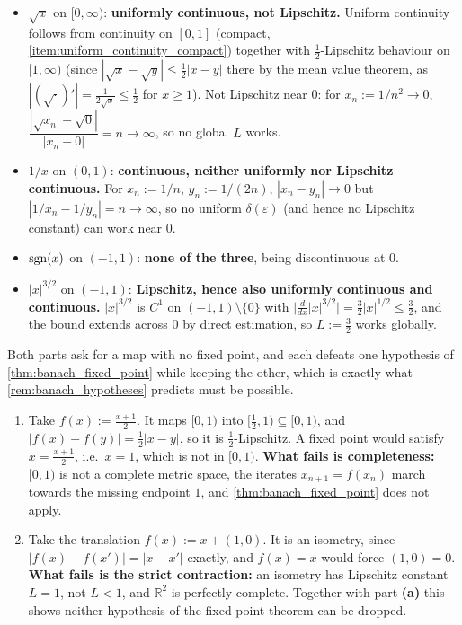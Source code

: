 \begin{exercisesolution}
\label{sol:continuity_classification}
\begin{itemize}
  \item $\sqrt{x}$ on $[0,\infty)$: \textbf{uniformly continuous, not Lipschitz.} Uniform
    continuity follows from continuity on $[0,1]$ (compact, \cref{item:uniform_continuity_compact})
    together with $\tfrac12$-Lipschitz behaviour on $[1,\infty)$ (since $|\sqrt x - \sqrt y| \leq
    \tfrac12|x-y|$ there by the mean value theorem, as $|(\sqrt{\cdot})'| = \tfrac{1}{2\sqrt x}
    \leq \tfrac12$ for $x \geq 1$). Not Lipschitz near $0$: for $x_n :=
    1/n^2 \to 0$, $\dfrac{|\sqrt{x_n}-\sqrt0|}{|x_n-0|} = n \to \infty$, so no global $L$ works.
  \item $1/x$ on $(0,1)$: \textbf{continuous, neither uniformly nor Lipschitz continuous.} For
    $x_n := 1/n$, $y_n := 1/(2n)$, $|x_n-y_n| \to 0$ but $|1/x_n - 1/y_n| = n \to \infty$, so no
    uniform $\delta(\varepsilon)$ (and hence no Lipschitz constant) can work near $0$.
  \item $\operatorname{sgn}(x)$ on $(-1,1)$: \textbf{none of the three}, being discontinuous at $0$.
  \item $|x|^{3/2}$ on $(-1,1)$: \textbf{Lipschitz, hence also uniformly continuous and
    continuous.} $|x|^{3/2}$ is $C^1$ on $(-1,1)\setminus\{0\}$ with $\big|\tfrac{d}{dx}|x|^{3/2}\big|
    = \tfrac32|x|^{1/2} \leq \tfrac32$, and the bound extends across $0$ by direct estimation, so
    $L := \tfrac32$ works globally.
\end{itemize}
\end{exercisesolution}

\begin{exercisesolution}
\label{sol:lipschitz_or_not}
Both parts ask for a map with no fixed point, and each defeats one hypothesis of
\cref{thm:banach_fixed_point} while keeping the other, which is exactly what
\cref{rem:banach_hypotheses} predicts must be possible.
\begin{enumerate}[label=\textbf{(\alph*)}]
  \item Take $f(x) := \tfrac{x+1}{2}$. It maps $[0,1)$ into $[\tfrac12,1) \subseteq [0,1)$, and
    $|f(x)-f(y)| = \tfrac12|x-y|$, so it is $\tfrac12$-Lipschitz. A fixed point would satisfy
    $x = \tfrac{x+1}{2}$, i.e.\ $x = 1$, which is not in $[0,1)$. \textbf{What fails is
    completeness:} $[0,1)$ is not a complete metric space, the iterates
    $x_{n+1} = f(x_n)$ march towards the missing endpoint $1$, and \cref{thm:banach_fixed_point}
    does not apply.
  \item Take the translation $f(x) := x + (1,0)$. It is an isometry, since
    $|f(x)-f(x')| = |x-x'|$ exactly, and $f(x) = x$ would force $(1,0) = 0$. \textbf{What
    fails is the strict contraction:} an isometry has Lipschitz constant $L = 1$, not $L < 1$,
    and $\mathbb{R}^2$ is perfectly complete. Together with part \textbf{(a)} this shows neither
    hypothesis of the fixed point theorem can be dropped.
\end{enumerate}
\end{exercisesolution}


